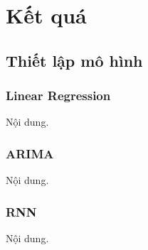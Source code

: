 \section{Kết quá}

\subsection{Thiết lập mô hình} 
\subsubsection{Linear Regression}
Nội dung.

\subsubsection{ARIMA}
Nội dung.

\subsubsection{RNN}
Nội dung.


